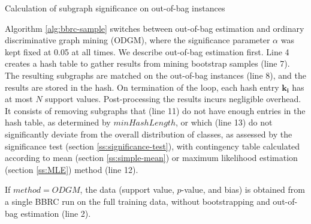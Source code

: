 \documentclass{sig-alternate}
\begin{document}
\begin{algorithm2e*}[t]
  \fontsize{8}{10}
  \selectfont
  \caption{Calculation of subgraph significance on out-of-bag instances\label{alg:bbrc-sample}}
\end{algorithm2e*}
Algorithm \ref{alg:bbrc-sample} switches between out-of-bag estimation and ordinary discriminative graph mining (ODGM), where 
the significance parameter $\alpha$ was kept fixed at 0.05 at all times.
We describe out-of-bag estimation first. Line 4
creates a hash table to gather results from mining bootstrap samples 
(line 7). The resulting subgraphs are matched on the out-of-bag instances (line
8), and the results are stored in the hash. On termination of the loop, each hash
entry $\mathbf{k_i}$ has at most $N$ support values. Post-processing the results
incurs negligible overhead. It
consists of removing subgraphs that (line 11) do not have enough entries in the hash table, as
determined by $minHashLength$, or which (line 13) do not significantly
deviate from the overall distribution of classes, as assessed by the significance
test (section \ref{ss:significance-test}), with contingency table calculated
according to mean (section \ref{ss:simple-mean}) or maximum likelihood
estimation (section \ref{ss:MLE}) method (line 12). 

If $method=ODGM$, the data (support value, $p$-value, and bias) is obtained from a single BBRC run on the full training data, without bootstrapping and out-of-bag estimation (line 2).
\end{document}
